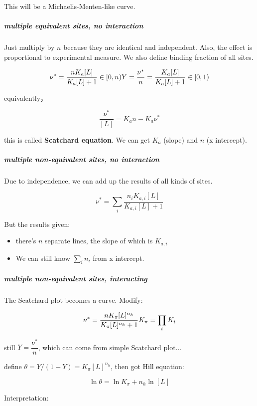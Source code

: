 \documentclass[]{article}
\let\oldsubparagraph\subparagraph
\renewcommand{\subparagraph}[1]{\oldsubparagraph{#1}\mbox{}}
\begin{document}
This will be a Michaelis-Menten-like curve.

\hypertarget{multiple-equivalent-sites-no-interaction}{%
\subparagraph{multiple equivalent sites, no
interaction}\label{multiple-equivalent-sites-no-interaction}}

Just multiply by \(n\) because they are identical and independent. Also,
the effect is proportional to experimental measure. We also define
binding fraction of all sites.

\[\nu^*=\dfrac{nK_a[L]}{K_a[L]+1} \in[0,n)\\
Y=\dfrac{\nu^*}{n}=\dfrac{K_a[L]}{K_a[L]+1}\in[0,1)\]

equivalently，

\[\dfrac{\nu^*}{[L]}=K_an-K_a\nu^*\]

this is called \textbf{Scatchard equation}. We can get \(K_a\) (slope)
and \(n\) (x intercept).

\hypertarget{multiple-non-equivalent-sites-no-interaction}{%
\subparagraph{multiple non-equivalent sites, no
interaction}\label{multiple-non-equivalent-sites-no-interaction}}

Due to independence, we can add up the results of all kinds of sites.

\[\nu^*=\sum_i\dfrac{n_iK_{a,i}[L]}{K_{a,i}[L]+1}\]

But the results given:

\begin{itemize}
\item
  there's \(n\) separate lines, the slope of which is \(K_{a,i}\)
\item
  We can still know \(\sum\limits_i n_i\) from x intercept.
\end{itemize}

\hypertarget{multiple-non-equivalent-sites-interacting}{%
\subparagraph{multiple non-equivalent sites,
interacting}\label{multiple-non-equivalent-sites-interacting}}

The Scatchard plot becomes a curve. Modify:

\[\nu^*=\dfrac{nK_\pi[L]^{n_h}}{K_\pi[L]^{n_h}+1}\\
K_\pi=\prod_iK_i\]

still \(Y=\dfrac{\nu^*}{n}\), which can come from simple Scatchard
plot...

define \(\theta=Y/(1-Y)=K_\pi[L]^{n_h}\), then got Hill equation:

\[\ln\theta=\ln K_\pi+n_h\ln[L]\]

Interpretation:
\end{document}
